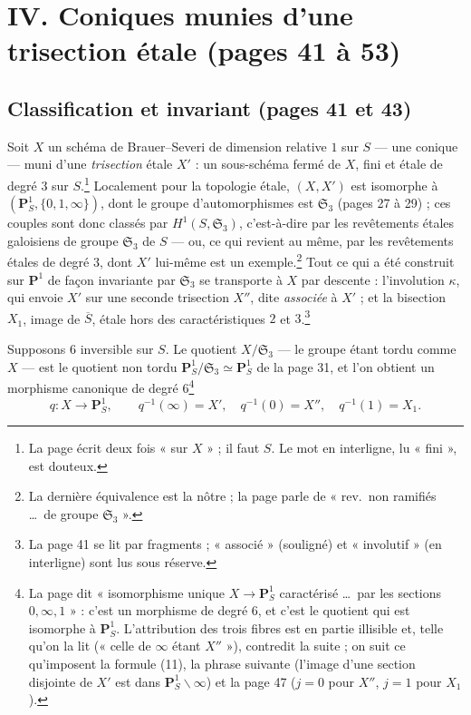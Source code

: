 \documentclass[11pt,a4paper]{article}
\begin{document}
\section*{IV. Coniques munies d'une trisection étale (pages 41 à 53)}

\subsection*{Classification et invariant (pages 41 et 43)}

Soit $X$ un schéma de Brauer--Severi de dimension relative $1$ sur $S$ --- une
conique --- muni d'une \emph{trisection} étale $X'$ : un sous-schéma fermé de
$X$, fini et étale de degré $3$ sur $S$.\footnote{La page écrit deux fois « sur
$X$ » ; il faut $S$. Le mot en interligne, lu « fini », est
douteux.} Localement pour la topologie étale, $(X, X')$ est isomorphe à
$(\mathbf{P}^1_S, \{0, 1, \infty\})$, dont le groupe d'automorphismes est
$\mathfrak{S}_3$ (pages 27 à 29) ; ces couples sont donc classés par
$H^1(S, \mathfrak{S}_3)$, c'est-à-dire par les revêtements étales galoisiens
de groupe $\mathfrak{S}_3$ de $S$ --- ou, ce qui revient au même, par les
revêtements étales de degré $3$, dont $X'$ lui-même est un exemple.\footnote{La
dernière équivalence est la nôtre ; la page parle de « rev.\ non ramifiés
\ldots\ de groupe $\mathfrak{S}_3$ ».} Tout ce qui a été construit sur
$\mathbf{P}^1$ de façon invariante par $\mathfrak{S}_3$ se transporte à $X$
par descente : l'involution $\kappa$, qui envoie $X'$ sur une seconde
trisection $X''$, dite \emph{associée} à $X'$ ; et la bisection $X_1$, image
de $\overline{S}$, étale hors des caractéristiques $2$ et $3$.\footnote{La page
41 se lit par fragments ; « associé » (souligné) et « involutif » (en interligne) sont lus sous réserve.}

Supposons $6$ inversible sur $S$. Le quotient $X/\mathfrak{S}_3$ --- le
groupe étant tordu comme $X$ --- est le quotient non tordu
$\mathbf{P}^1_S/\mathfrak{S}_3 \simeq \mathbf{P}^1_S$ de la page 31, et l'on
obtient un morphisme canonique de degré $6$\footnote{La page dit « isomorphisme unique $X \to \mathbf{P}^1_S$ caractérisé
\ldots\ par les sections $0, \infty, 1$ » : c'est un morphisme de degré $6$,
et c'est le quotient qui est isomorphe à $\mathbf{P}^1_S$. L'attribution des
trois fibres est en partie illisible et, telle qu'on la lit (« celle de $\infty$ étant $X''$ »), contredit la suite ; on suit ce qu'imposent la formule
(11), la phrase suivante (l'image d'une section disjointe de $X'$ est dans
$\mathbf{P}^1_S \smallsetminus \infty$) et la page 47 ($j = 0$ pour $X''$, $j =
1$ pour $X_1$).}
\[
q\colon X \to \mathbf{P}^1_S,
\qquad q^{-1}(\infty) = X',\quad q^{-1}(0) = X'',\quad q^{-1}(1) = X_1 .
\]
\end{document}
